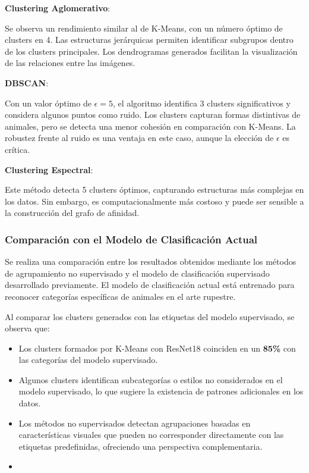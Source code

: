 \textbf{Clustering Aglomerativo}:

Se observa un rendimiento similar al de K-Means, con un número óptimo de clusters en 4.
Las estructuras jerárquicas permiten identificar subgrupos dentro de los clusters principales.
Los dendrogramas generados facilitan la visualización de las relaciones entre las imágenes.

\textbf{DBSCAN}:

Con un valor óptimo de $\epsilon=5$, el algoritmo identifica 3 clusters significativos y considera algunos puntos como ruido.
Los clusters capturan formas distintivas de animales, pero se detecta una menor cohesión en comparación con K-Means.
La robustez frente al ruido es una ventaja en este caso, aunque la elección de $\epsilon$ es crítica.

\textbf{Clustering Espectral}:

Este método detecta 5 clusters óptimos, capturando estructuras más complejas en los datos.
Sin embargo, es computacionalmente más costoso y puede ser sensible a la construcción del grafo de afinidad.


\subsubsection{Comparación con el Modelo de Clasificación Actual}

Se realiza una comparación entre los resultados obtenidos mediante los métodos de agrupamiento no supervisado y el modelo de clasificación supervisado desarrollado previamente.
El modelo de clasificación actual está entrenado para reconocer categorías específicas de animales en el arte rupestre.

Al comparar los clusters generados con las etiquetas del modelo supervisado, se observa que:

\begin{itemize}
    \item Los clusters formados por K-Means con ResNet18 coinciden en un \textbf{85\%} con las categorías del modelo supervisado.
    \item Algunos clusters identifican subcategorías o estilos no considerados en el modelo supervisado, lo que sugiere la existencia de patrones adicionales en los datos.
    \item Los métodos no supervisados detectan agrupaciones basadas en características visuales que pueden no corresponder directamente con las etiquetas predefinidas, ofreciendo una perspectiva complementaria.
\item \end{itemize}

